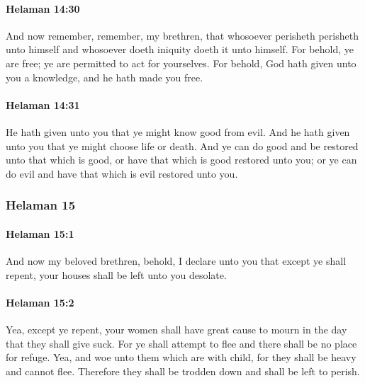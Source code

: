 		\paragraph{Helaman 14:30} %
			\label{HELAMAN-14-30}

			And now remember, remember, my brethren,
			that whosoever perisheth perisheth unto himself
			and whosoever doeth iniquity doeth it unto himself.
			For behold, ye are free;
			ye are permitted to act for yourselves.
			For behold, God hath given unto you a knowledge,
			and he hath made you free.

		\paragraph{Helaman 14:31} %
			\label{HELAMAN-14-31}

			He hath given unto you that ye might know good from evil.
			And he hath given unto you that ye might choose life or death.
			And ye can do good and be restored unto that which is good,
			or have that which is good restored unto you;
			or ye can do evil and have that which is evil restored unto you.

	\subsubsection{Helaman 15} %
		\label{HELAMAN-15}
		
		\paragraph{Helaman 15:1} %
			\label{HELAMAN-15-1}

			And now my beloved brethren,
			behold, I declare unto you
			that except ye shall repent,
			your houses shall be left unto you desolate.

		\paragraph{Helaman 15:2} %
			\label{HELAMAN-15-2}

			Yea, except ye repent,
			your women shall have great cause to mourn
			in the day that they shall give suck.
			For ye shall attempt to flee and there shall be no place for refuge.
			Yea, and woe unto them which are with child,
			for they shall be heavy and cannot flee.
			Therefore they shall be trodden down and shall be left to perish.

